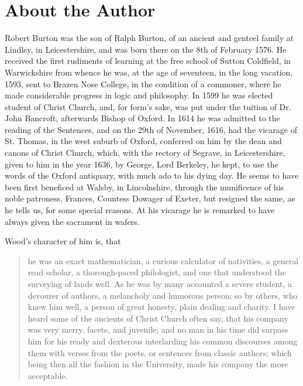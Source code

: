 \chapter{About the Author}
Robert Burton was the son of Ralph Burton, of an ancient and genteel family at Lindley, in Leicestershire, and was born there on the 8th of February 1576.
He received the first rudiments of learning at the free school of Sutton Coldfield, in Warwickshire from whence he was, at the age of seventeen, in the long vacation, 1593, sent to Brazen Nose College, in the condition of a commoner, where he made considerable progress in logic and philosophy.
In 1599 he was elected student of Christ Church, and, for form's sake, was put under the tuition of Dr. John Bancroft, afterwards Bishop of Oxford.
In 1614 he was admitted to the reading of the Sentences, and on the 29th of November, 1616, had the vicarage of St. Thomas, in the west suburb of Oxford, conferred on him by the dean and canons of Christ Church, which, with the rectory of Segrave, in Leicestershire, given to him in the year 1636, by George, Lord Berkeley, he kept, to use the words of the Oxford antiquary, with much ado to his dying day.
He seems to have been first beneficed at Walsby, in Lincolnshire, through the munificence of his noble patroness, Frances, Countess Dowager of Exeter, but resigned the same, as he tells us, for some special reasons.
At his vicarage he is remarked to have always given the sacrament in wafers.

Wood's character of him is, that \blockquote{he was an exact mathematician, a curious calculator of nativities, a general read scholar, a thorough-paced philologist, and one that understood the surveying of lands well.
As he was by many accounted a severe student, a devourer of authors, a melancholy and humorous person; so by others, who knew him well, a person of great honesty, plain dealing and charity.
I have heard some of the ancients of Christ Church often say, that his company was very merry, facete, and juvenile; and no man in his time did surpass him for his ready and dexterous interlarding his common discourses among them with verses from the poets, or sentences from classic authors; which being then all the fashion in the University, made his company the more acceptable.}

